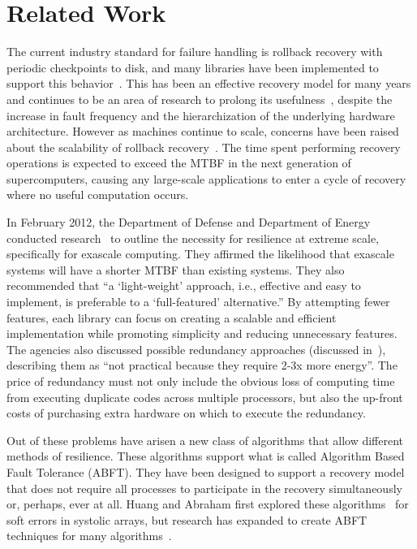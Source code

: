\section{Related Work}\label{sect:related}


The current industry standard for failure handling is rollback recovery with
periodic checkpoints to disk, and many libraries have been implemented to
support this behavior~\cite{Duell:tr, Litzkow:1997wd, Plank:1994wz,
Zhong:2001tq}. This has been an effective recovery model for many years and
continues to be an area of research to prolong its
usefulness~\cite{BautistaGomez:2011hg, BuntinasFGCS2008, Elnozahy:2002p3769},
despite the increase in fault frequency and the hierarchization of the
underlying hardware architecture.  However as machines continue to scale,
concerns have been raised about the scalability of rollback
recovery~\cite{Cappello:2009hs}.  The time spent performing recovery operations
is expected to exceed the MTBF in the next generation of supercomputers, causing
any large-scale applications to enter a cycle of recovery where no useful
computation occurs.


In February 2012, the Department of Defense and Department of Energy conducted
research~\cite{Daly:2012vg} to outline the necessity for resilience at extreme
scale, specifically for exascale computing. They affirmed the likelihood that
exascale systems will have a shorter MTBF than existing systems. They also
recommended that ``a `light-weight' approach, i.e., effective and easy to
implement, is preferable to a `full-featured' alternative.'' By attempting fewer
features, each library can focus on creating a scalable and efficient
implementation while promoting simplicity and reducing unnecessary features. The
agencies also discussed possible redundancy approaches (discussed
in~\cite{BosilcaINRIARep7950, Ferreira:2011fb}), describing them as ``not
practical because they require 2-3x more energy''. The price of redundancy must
not only include the obvious loss of computing time from executing duplicate
codes across multiple processors, but also the up-front costs of purchasing
extra hardware on which to execute the redundancy.


Out of these problems have arisen a new class of algorithms that allow different
methods of resilience. These algorithms support what is called Algorithm Based
Fault Tolerance (ABFT). They have been designed to support a recovery model that
does not require all processes to participate in the recovery simultaneously or,
perhaps, ever at all. Huang and Abraham first explored these
algorithms~\cite{Huang:1984kt} for soft errors in systolic arrays, but research
has expanded to create ABFT techniques for many algorithms~\cite{Du:2012je, Plank:1995hv}.

